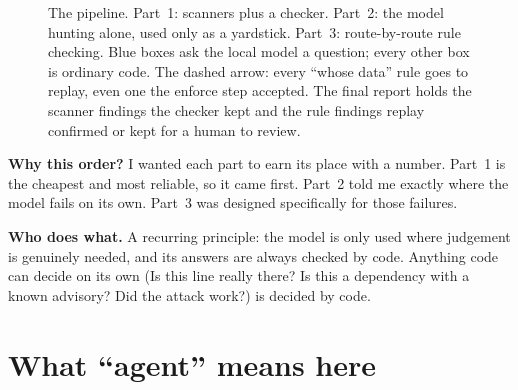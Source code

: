 \documentclass[11pt,a4paper]{article}
\begin{document}
\begin{figure}[H]
\caption{The pipeline. Part~1: scanners plus a checker. Part~2: the model hunting alone, used only as a
yardstick. Part~3: route-by-route rule checking. Blue boxes ask the local model a question; every other box is
ordinary code. The dashed arrow: every ``whose data'' rule goes to replay, even one the enforce step accepted. The final report holds the scanner findings the checker kept and the rule findings replay confirmed or kept for a human to review.}
\label{fig:pipeline}
\end{figure}

\textbf{Why this order?} I wanted each part to earn its place with a number. Part~1 is the cheapest and
most reliable, so it came first. Part~2 told me exactly where the model fails on its own. Part~3 was
designed specifically for those failures.

\textbf{Who does what.} A recurring principle: the model is only used where judgement is genuinely needed,
and its answers are always checked by code. Anything code can decide on its own (Is this line really
there? Is this a dependency with a known advisory? Did the attack work?) is decided by code.

\section{What ``agent'' means here}
\label{sec:agent}
\end{document}
